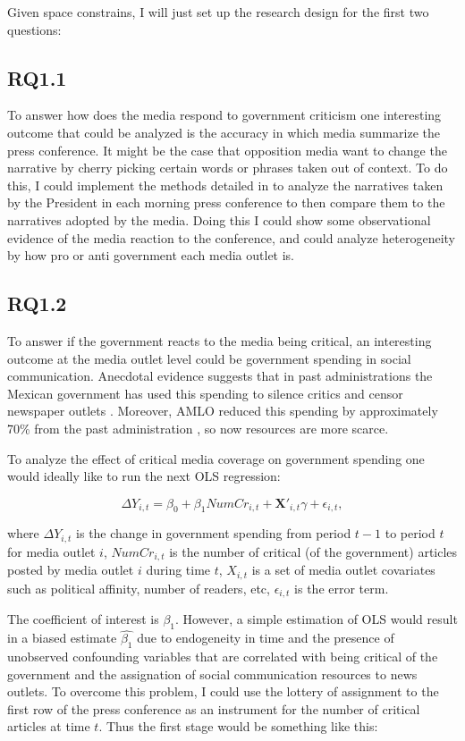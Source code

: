 \documentclass[14]{article}
\begin{document}
Given space constrains, I will just set up the research design for the first two questions: 

\subsection{RQ1.1}

To answer how does the media respond to government criticism one interesting outcome that could be analyzed is the accuracy in which media summarize the press conference. It might be the case that opposition media want to change the narrative by cherry picking certain words or phrases taken out of context. To do this, I could implement the methods detailed in \cite{QNarr-Waight-WP} to analyze the narratives taken by the President in each morning press conference to then compare them to the narratives adopted by the media. Doing this I could show some observational evidence of the media reaction to the conference, and could analyze heterogeneity by how pro or anti government each media outlet is.

\subsection{RQ1.2}

To answer if the government reacts to the media being critical, an interesting outcome at the media outlet level could be government spending in social communication. Anecdotal evidence suggests that in past administrations the Mexican government has used this spending to silence critics and censor newspaper outlets \citep{Times}. Moreover, AMLO reduced this spending by approximately 70\% from the past administration \citep{Article19}, so now resources are more scarce. 

To analyze the effect of critical media coverage on government spending one would ideally like to run the next OLS regression: 

$$\Delta Y_{i,t} = \beta_0 + \beta_1 NumCr_{i, t} + \mathbf{X'}_{i,t}\gamma + \epsilon_{i, t},$$

\noindent where $\Delta Y_{i,t}$ is the change in government spending from period $t-1$ to period $t$ for media outlet $i$, $NumCr_{i, t}$ is the number of critical (of the government) articles posted by media outlet $i$ during time $t$, $X_{i, t}$ is a set of media outlet covariates such as political affinity, number of readers, etc, $\epsilon_{i, t}$ is the error term. 

The coefficient of interest is $\beta_1$. However, a simple estimation of OLS would result in a biased estimate $\hat{\beta_1}$ due to endogeneity in time and the presence of unobserved confounding variables that are correlated with being critical of the government and the assignation of social communication resources to news outlets. To overcome this problem, I could use the lottery of assignment to the first row of the press conference as an instrument for the number of critical articles at time $t$. Thus the first stage would be something like this: 
\end{document}
